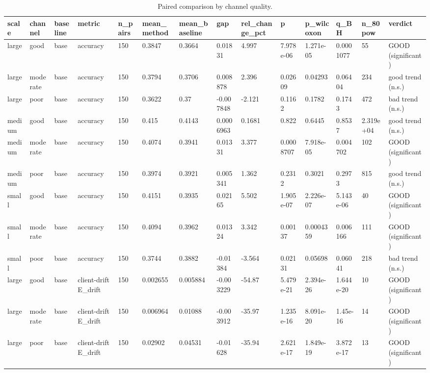 \begin{table}[t]\centering\footnotesize
\caption{Paired comparison by channel quality.}\label{tab:table6_paired_by_channel}
\begin{tabular}{llllllllllllll}
\toprule
scale & channel & baseline & metric & n\_pairs & mean\_method & mean\_baseline & gap & rel\_change\_pct & p & p\_wilcoxon & q\_BH & n\_80pow & verdict \\
\midrule
large & good & base & accuracy & 150 & 0.3847 & 0.3664 & 0.01831 & 4.997 & 7.978e-06 & 1.271e-05 & 0.0001077 & 55 & GOOD (significant) \\
large & moderate & base & accuracy & 150 & 0.3794 & 0.3706 & 0.008878 & 2.396 & 0.02609 & 0.04293 & 0.06404 & 234 & good trend (n.s.) \\
large & poor & base & accuracy & 150 & 0.3622 & 0.37 & -0.007848 & -2.121 & 0.1162 & 0.1782 & 0.1743 & 472 & bad trend (n.s.) \\
medium & good & base & accuracy & 150 & 0.415 & 0.4143 & 0.0006963 & 0.1681 & 0.822 & 0.6445 & 0.8537 & 2.319e+04 & good trend (n.s.) \\
medium & moderate & base & accuracy & 150 & 0.4074 & 0.3941 & 0.01331 & 3.377 & 0.0008707 & 7.918e-05 & 0.004702 & 102 & GOOD (significant) \\
medium & poor & base & accuracy & 150 & 0.3974 & 0.3921 & 0.005341 & 1.362 & 0.2312 & 0.3021 & 0.2973 & 815 & good trend (n.s.) \\
small & good & base & accuracy & 150 & 0.4151 & 0.3935 & 0.02165 & 5.502 & 1.905e-07 & 2.226e-07 & 5.143e-06 & 40 & GOOD (significant) \\
small & moderate & base & accuracy & 150 & 0.4094 & 0.3962 & 0.01324 & 3.342 & 0.00137 & 0.0004359 & 0.006166 & 111 & GOOD (significant) \\
small & poor & base & accuracy & 150 & 0.3744 & 0.3882 & -0.01384 & -3.564 & 0.02131 & 0.05698 & 0.06041 & 218 & bad trend (n.s.) \\
large & good & base & client-drift E\_drift & 150 & 0.002655 & 0.005884 & -0.003229 & -54.87 & 5.479e-21 & 2.394e-26 & 1.644e-20 & 10 & GOOD (significant) \\
large & moderate & base & client-drift E\_drift & 150 & 0.006964 & 0.01088 & -0.003912 & -35.97 & 1.235e-16 & 8.091e-20 & 1.45e-16 & 14 & GOOD (significant) \\
large & poor & base & client-drift E\_drift & 150 & 0.02902 & 0.04531 & -0.01628 & -35.94 & 2.621e-17 & 1.849e-19 & 3.872e-17 & 13 & GOOD (significant) \\

\end{tabular}
\end{table}
